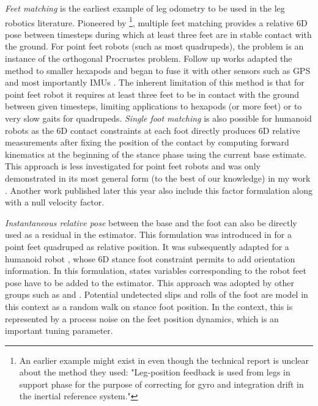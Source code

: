 \textit{Feet matching} is the earliest example of leg odometry to be used in the leg robotics literature. Pioneered by \cite{roston1991dead} 
\footnote{An earlier example might exist in \cite{waldron1986adaptive} even though the technical report is unclear about the method they used: 
"Leg-position feedback is used from legs in support phase for the purpose of correcting for gyro and integration drift in the inertial reference system."},
multiple feet matching provides a relative 6D pose between timesteps during which at least three feet are in stable contact with the ground.
For point feet robots (such as most quadrupeds), the problem %
is an instance of the orthogonal Procrustes problem.
Follow up works adapted the method to smaller hexapods \cite{lin2005leg} and began to fuse it with other sensors such as GPS \cite{gassmann2005localization, cobano2008location} 
and most importantly IMUs \cite{lin2006sensor, reinstein2011dead}.
The inherent limitation of this method is that for point feet robot it requires at least three feet to be in contact with the ground between given timesteps, limiting
applications to hexapods (or more feet) or to very slow gaits for quadrupeds.
\textit{Single foot matching} is also possible for humanoid robots as the 6D contact constraints at each foot directly produces 6D 
relative measurements \cite{flayols2017experimental,xinjilefu2014decoupled,johnson2015team} after fixing the position of the contact by computing forward kinematics 
at the beginning of the stance phase using the current base estimate. This approach is less investigated for point feet robots and was only 
demonstrated in its most general form (to the best of our knowledge) in my work \cite{fourmy2021contact}. Another work published later this year \cite{kim2021legged} also include this factor formulation along with a null velocity factor. 

\textit{Instantaneous relative pose} between the base and the foot can also be directly used as a residual in the estimator. This formulation
was introduced in \cite{bloesch2013state, bloesch2013stateSlippery} for a point feet quadruped as relative position. It was subsequently adapted for a humanoid robot \cite{rotella2014state}, 
whose 6D stance foot constraint permits to add orientation information. In this formulation, states variables corresponding to the robot feet pose have to 
be added to the estimator. This approach was adopted by other groups such as \cite{hartley2018legged, hartley2018hybrid, hartley2020contact} and \cite{bledt2018cheetah}.
Potential undetected slips and rolls of the foot are model in this context as a random walk on stance foot position. In the \KalmanF context, this is represented 
by a process noise on the feet position dynamics, which is an important tuning parameter.

